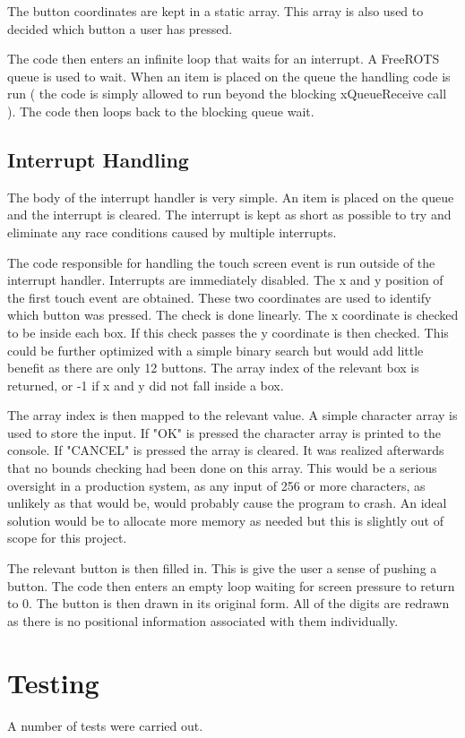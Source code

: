 \documentclass[a4paper, 10pt, titlepage]{article}
\begin{document}
The button coordinates are kept in a static array. This array is also used to decided which button a user has pressed.

The code then enters an infinite loop that waits for an interrupt. A FreeROTS queue is used to wait. When an item is placed on the queue the handling code is run ( the code is simply allowed to run beyond the blocking xQueueReceive call ). The code then loops back to the blocking queue wait.

\subsection{Interrupt Handling}
The body of the interrupt handler is very simple. An item is placed on the queue and the interrupt is cleared. The interrupt is kept as short as possible to try and eliminate any race conditions caused by multiple interrupts.

The code responsible for handling the touch screen event is run outside of the interrupt handler. Interrupts are immediately disabled. The x and y position of the first touch event are obtained. These two coordinates are used to identify which button was pressed. The check is done linearly. The x coordinate is checked to be inside each box. If this check passes the y coordinate is then checked. This could be further optimized with a simple binary search but would add little benefit as there are only 12 buttons. The array index of the relevant box is returned, or -1 if x and y did not fall inside a box.

The array index is then mapped to the relevant value. A simple character array is used to store the input. If "OK" is pressed the character array is printed to the console. If "CANCEL" is pressed the array is cleared. It was realized afterwards that no bounds checking had been done on this array. This would be a serious oversight in a production system, as any input of 256 or more characters, as unlikely as that would be, would probably cause the program to crash. An ideal solution would be to allocate more memory as needed but this is slightly out of scope for this project.

The relevant button is then filled in. This is give the user a sense of pushing a button. The code then enters an empty loop waiting for screen pressure to return to 0. The button is then drawn in its original form. All of the digits are redrawn as there is no positional information associated with them individually.


\section{Testing}
A number of tests were carried out.
\end{document}
